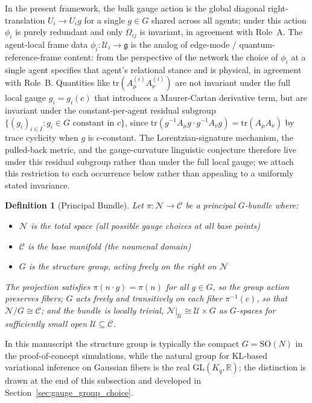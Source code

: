 \documentclass[11pt]{article}
\newtheorem{definition}{Definition}
\begin{document}
In the present framework, the bulk gauge action is the global diagonal right-translation $U_i \to U_i g$ for a single $g \in G$ shared across all agents; under this action $\phi_i$ is purely redundant and only $\Omega_{ij}$ is invariant, in agreement with Role~A. The agent-local frame data $\phi_i: \mathcal{U}_i \to \mathfrak{g}$ is the analog of edge-mode / quantum-reference-frame content: from the perspective of the network the choice of $\phi_i$ at a single agent specifies that agent's relational stance and is physical, in agreement with Role~B. Quantities like $\mathrm{tr}(A^{(i)}_\mu A^{(i)}_\nu)$ are not invariant under the full local gauge $g_i = g_i(c)$ that introduces a Maurer-Cartan derivative term, but are invariant under the constant-per-agent residual subgroup $\{(g_i)_{i \in I} : g_i \in G \text{ constant in } c\}$, since $\mathrm{tr}(g^{-1}A_\mu g \cdot g^{-1}A_\nu g) = \mathrm{tr}(A_\mu A_\nu)$ by trace cyclicity when $g$ is $c$-constant. The Lorentzian-signature mechanism, the pulled-back metric, and the gauge-curvature linguistic conjecture therefore live under this residual subgroup rather than under the full local gauge; we attach this restriction to each occurrence below rather than appealing to a uniformly stated invariance.

\begin{definition}[Principal Bundle]
Let $\pi: \mathcal{N} \to \mathcal{C}$ be a principal $G$-bundle where:
\begin{itemize}
\item $\mathcal{N}$ is the total space (all possible gauge choices at all base points)
\item $\mathcal{C}$ is the base manifold (the noumenal domain)
\item $G$ is the structure group, acting freely on the right on $\mathcal{N}$
\end{itemize}
The projection satisfies $\pi(n \cdot g) = \pi(n)$ for all $g \in G$, so the group action preserves fibers; $G$ acts freely and transitively on each fiber $\pi^{-1}(c)$, so that $\mathcal{N}/G \cong \mathcal{C}$; and the bundle is locally trivial, $\mathcal{N}|_{\mathcal{U}} \cong \mathcal{U} \times G$ as $G$-spaces for sufficiently small open $\mathcal{U} \subseteq \mathcal{C}$.
\end{definition}

In this manuscript the structure group is typically the compact $G = \mathrm{SO}(N)$ in the proof-of-concept simulations, while the natural group for KL-based variational inference on Gaussian fibers is the real $\mathrm{GL}(K_q, \mathbb{R})$; the distinction is drawn at the end of this subsection and developed in Section~\ref{sec:gauge_group_choice}.
\end{document}
